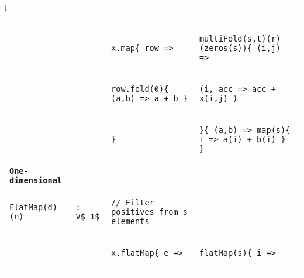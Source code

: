 \begin{figure*}
\begin{tabular}{l}
{\begin{tabular}{ll|l|l}
{} & {} & {\begin{lstlisting}[numbers=none,mathescape=true]
x.map{ row =>
\end{lstlisting}} &
{\begin{lstlisting}[numbers=none,mathescape=true]
multiFold(s,t)(r)(zeros(s)){ (i,j) =>
\end{lstlisting}} \\
\vspace{-0.075cm}

{} & {} & {\begin{lstlisting}[numbers=none,mathescape=true]
  row.fold(0){ (a,b) => a + b }
\end{lstlisting}} &
{\begin{lstlisting}[numbers=none,mathescape=true]
  (i, acc => acc + x(i,j) )
\end{lstlisting}} \\
\vspace{-0.075cm}

{} & {} & {\begin{lstlisting}[numbers=none,mathescape=true]
}
\end{lstlisting}} &
{\begin{lstlisting}[numbers=none,mathescape=true]
}{ (a,b) => map(s){ i => a(i) + b(i) } }
\end{lstlisting}} \\ \arrayrulecolor[gray]{0.8}\hline
\vspace{-0.075cm}

{%
\scriptsize\textbf{\texttt{One-dimensional}}
} & & \\

\vspace{-0.075cm}
{\begin{lstlisting}[numbers=none,mathescape=true]
FlatMap(d)(n)
\end{lstlisting}} &
{\begin{lstlisting}[numbers=none,mathescape=true]
: V$_1$
\end{lstlisting}} &
{\begin{lstlisting}[numbers=none,mathescape=true]
// Filter positives from s elements
\end{lstlisting}} & {} \\
\vspace{-0.075cm}

{} & {} & {\begin{lstlisting}[numbers=none,mathescape=true]
x.flatMap{ e =>
\end{lstlisting}} &
{\begin{lstlisting}[numbers=none,mathescape=true]
flatMap(s){ i =>
\end{lstlisting}} \\
\vspace{-0.075cm}


\end{tabular}}
\end{tabular}
\end{figure*}
